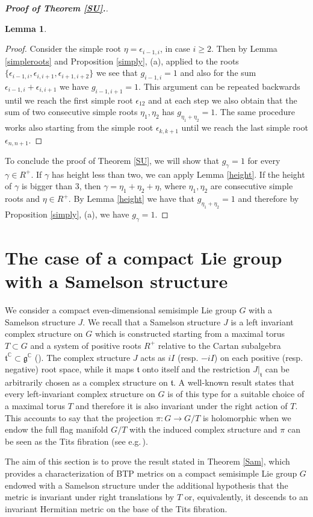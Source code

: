 \documentclass{amsart}
\numberwithin{equation}{section}
\newtheorem{lemma}  [theorem]     {Lemma}
\theoremstyle{definition}
\renewcommand{\1}{\mathds{1}}
\newcommand{\g}{\gamma}
\newcommand{\eps}{\epsilon}
\renewcommand{\gg}{\mathfrak g}
\newcommand{\gt}{\mathfrak t}
\renewcommand{\>}{\rightarrow}
\begin{document}
\begin{proof}[{\bf{Proof of Theorem \ref{SU}.}}]
\begin{lemma}
\end{lemma}
\begin{proof} Consider the simple root $\eta=\eps_{i-1,i}$, in case $i\geq 2$. Then by Lemma \ref{simpleroots} and Proposition \ref{simply}, (a), applied to the roots $\{\eps_{i-1,i},\eps_{i,i+1},\eps_{i+1,i+2}\}$ we see that $g_{i-1,i}=1$ and also for the sum $\eps_{i-1,i}+\eps_{i,i+1}$ we have $g_{i-1,i+1}=1$. This argument can be repeated
backwards until we reach the first simple root $\eps_{12}$ and at each step we also obtain that the sum of two consecutive simple roots $\eta_1,\eta_2$ has $g_{\eta_1+\eta_2}=1$.
The same procedure works also starting from the simple root $\eps_{k,k+1}$ until we reach the last simple root $\eps_{n,n+1}$.\end{proof}
To conclude the proof of Theorem \ref{SU}, we will show that $g_{\g}=1$ for every $\g\in R^+$. If $\g$ has height less than two, we can apply Lemma \ref{height}. If the height of $\g$ is bigger than $3$, then $\g=\eta_1+\eta_2+\eta$,
where $\eta_1,\eta_2$ are consecutive simple roots and $\eta\in R^+$. By Lemma \ref{height} we have that $g_{\eta_1+\eta_2}=1$ and therefore by Proposition \ref{simply}, (a), we have $g_\g=1$.\end{proof}
\bigskip


\section{The case of a compact Lie group with a Samelson structure}
\vspace{0.1cm}
We consider a compact even-dimensional semisimple Lie group $G$ with a Samelson structure $J$. We recall that a Samelson structure $J$ is a left invariant complex structure on $G$ which is constructed starting from a maximal torus $T\subset G$ and  a system of positive roots $R^+$ relative to the Cartan subalgebra $\gt^{\mathbb C}\subset \gg^{\mathbb C}$ (\cite{Samelson}). The complex structure $J$ acts as $ iI$ (resp. $-iI$) on each positive (resp. negative) root space, while it maps $\gt$ onto itself and the restriction $J|_{\gt}$ can be arbitrarily chosen as a complex structure on $\gt$. A well-known result states that every left-invariant complex structure on $G$ is of this type for a suitable choice of a maximal torus $T$ and therefore it is also invariant under the right action of $T$. This accounts to say that the projection $\pi:G\to G/T$ is holomorphic when we endow the full flag manifold $G/T$ with the induced complex structure and $\pi$ can be seen as the Tits fibration (see e.g.\,\cite{A}).\par
The aim of this section is to prove the result stated in Theorem \ref{Sam}, which provides a characterization of BTP metrics on a compact semisimple Lie group $G$ endowed with a Samelson structure under the additional hypothesis that the metric is invariant under right translations by $T$ or, equivalently, it descends to an invariant Hermitian metric on the base of the Tits fibration.
\end{document}
